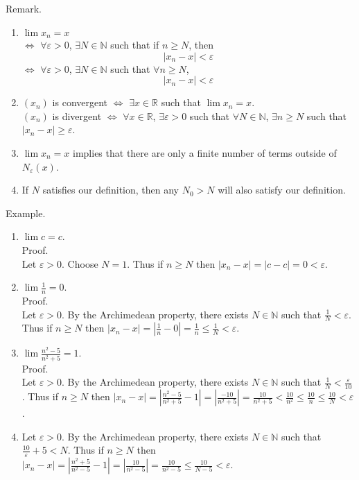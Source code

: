 \documentclass[twocolumn]{article}
\newcommand{\br}{\vspace{\baselineskip}}
\let\eps\varepsilon
\newcommand{\naturals}{\mathbb{N}}
\newcommand{\reals}{\mathbb{R}}
\begin{document}
Remark.
\begin{enumerate}
	\item
	$\lim x_n = x$ \\
	$\Leftrightarrow$ $\forall \eps > 0$, $\exists N \in \naturals$ such that if $n \geq N$, then
	$$|x_n - x| < \eps$$
	$\Leftrightarrow$ $\forall \eps > 0$, $\exists N \in \naturals$ such that $\forall n \geq N$,
	$$|x_n - x| < \eps$$
	\item
	$(x_n)$ is convergent $\Leftrightarrow$ $\exists x \in \reals$ such that $\lim x_n = x$. \\
	$(x_n)$ is divergent $\Leftrightarrow$ $\forall x \in \reals$, $\exists \eps > 0$ such that $\forall N \in \naturals$, $\exists n \geq N$ such that $|x_n - x| \geq \eps$.
	\item
	$\lim x_n = x$ implies that there are only a finite number of terms outside of $N_\eps(x)$.
	\item
	If $N$ satisfies our definition, then any $N_0 > N$ will also satisfy our definition.
\end{enumerate} \br

Example.
\begin{enumerate}
	\item
	$\lim c = c$. \\
	Proof. \\
	Let $\eps > 0$. Choose $N = 1$. Thus if $n \geq N$ then $|x_n - x| = |c - c| = 0 < \eps$.
	\item
	$\lim \frac{1}{n} = 0$. \\
	Proof. \\
	Let $\eps > 0$. By the Archimedean property, there exists $N \in \naturals$ such that $\frac{1}{N} < \eps$. Thus if $n \geq N$ then $|x_n - x| = |\frac{1}{n} - 0| = \frac{1}{n} \leq \frac{1}{N} < \eps$.
	\item
	$\lim \frac{n^2 - 5}{n^2 + 5} = 1$. \\
	Proof. \\
	Let $\eps > 0$. By the Archimedean property, there exists $N \in \naturals$ such that $\frac{1}{N} < \frac{\eps}{10}$. Thus if $n \geq N$ then $|x_n - x| = |\frac{n^2 - 5}{n^2 + 5} - 1| = |\frac{-10}{n^2 + 5}| = \frac{10}{n^2 + 5} < \frac{10}{n^2} \leq \frac{10}{n} \leq \frac{10}{N} < \eps$.
	\item
	Let $\eps > 0$. By the Archimedean property, there exists $N \in \naturals$ such that $\frac{10}{\eps} + 5 < N$. Thus if $n \geq N$ then $|x_n - x| = |\frac{n^2 + 5}{n^2 - 5} - 1| = |\frac{10}{n^2 - 5}| = \frac{10}{n^2 - 5} \leq \frac{10}{N - 5} < \eps$.
\end{enumerate} \br
\end{document}
